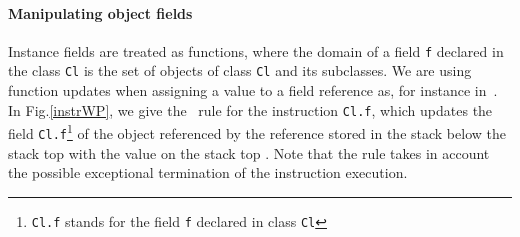 \paragraph*{Manipulating object fields}
Instance fields are treated as functions, where the domain of a field \texttt{f} 
declared in the class \texttt{Cl} is the set of objects of class \texttt{Cl} and its subclasses.
We are using function updates when assigning a value to a field reference as, for instance in~\cite{B00ppp}.
In Fig.\ref{instrWP}, we give the \wpi \ rule for the
instruction  \texttt{Cl.f}, which updates the field \texttt{Cl.f}\footnote{ \texttt{Cl.f} stands for the field \texttt{f} declared in class 
\texttt{Cl}} of the object referenced by the reference stored in the stack below the stack top  with the value on the stack top \stack{\counter}.
Note that the rule takes in account the possible exceptional termination of the instruction execution.




